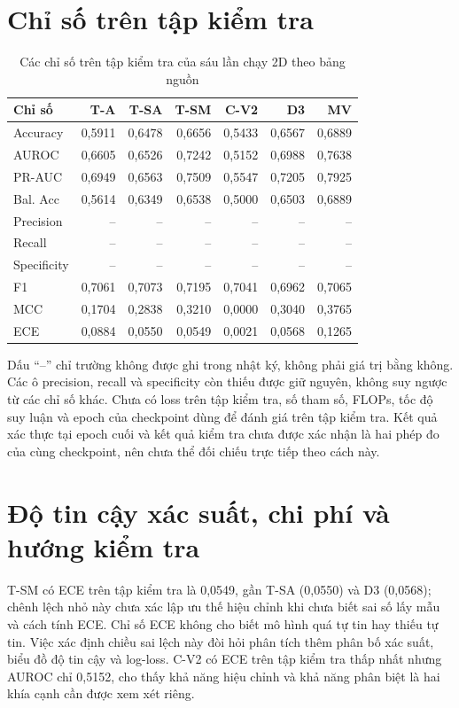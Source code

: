 \documentclass[14pt,a4paper,oneside]{extreport}
\begin{document}
\section{Chỉ số trên tập kiểm tra}
\begin{table}[htbp]
  \centering
  \caption{Các chỉ số trên tập kiểm tra của sáu lần chạy 2D theo bảng nguồn}
  \label{tab:sweep-2d-test}
  \setlength{\tabcolsep}{6pt}
  \begin{tabular}{@{}lrrrrrr@{}}
    \toprule
    Chỉ số & T-A & T-SA & T-SM & C-V2 & D3 & MV\\
    \midrule
    Accuracy & 0,5911 & 0,6478 & 0,6656 & 0,5433 & 0,6567 & 0,6889\\
    AUROC & 0,6605 & 0,6526 & 0,7242 & 0,5152 & 0,6988 & 0,7638\\
    PR-AUC & 0,6949 & 0,6563 & 0,7509 & 0,5547 & 0,7205 & 0,7925\\
    Bal. Acc & 0,5614 & 0,6349 & 0,6538 & 0,5000 & 0,6503 & 0,6889\\
    Precision & -- & -- & -- & -- & -- & --\\
    Recall & -- & -- & -- & -- & -- & --\\
    Specificity & -- & -- & -- & -- & -- & --\\
    F1 & 0,7061 & 0,7073 & 0,7195 & 0,7041 & 0,6962 & 0,7065\\
    MCC & 0,1704 & 0,2838 & 0,3210 & 0,0000 & 0,3040 & 0,3765\\
    ECE & 0,0884 & 0,0550 & 0,0549 & 0,0021 & 0,0568 & 0,1265\\
    \bottomrule
  \end{tabular}
\end{table}
Dấu ``--'' chỉ trường không được ghi trong nhật ký, không phải giá trị bằng không.
Các ô precision, recall và specificity còn thiếu được giữ nguyên, không suy ngược
từ các chỉ số khác. Chưa có loss trên tập kiểm tra, số tham số, FLOPs,
tốc độ suy luận và epoch của checkpoint dùng để đánh giá trên tập kiểm tra.
Kết quả xác thực tại epoch cuối và kết quả kiểm tra chưa được xác nhận là
hai phép đo của cùng checkpoint, nên chưa thể đối chiếu trực tiếp theo cách này.
\FloatBarrier

\section{Độ tin cậy xác suất, chi phí và hướng kiểm tra}
T-SM có ECE trên tập kiểm tra là 0,0549, gần T-SA (0,0550) và D3 (0,0568);
chênh lệch nhỏ này chưa xác lập ưu thế hiệu chỉnh khi chưa biết sai số
lấy mẫu và cách tính ECE. Chỉ số ECE không cho biết mô hình quá tự tin
hay thiếu tự tin. Việc xác định chiều sai lệch này đòi hỏi phân tích
thêm phân bố xác suất, biểu đồ độ tin cậy và log-loss. C-V2 có ECE trên tập kiểm tra thấp nhất
nhưng AUROC chỉ 0,5152, cho thấy khả năng hiệu chỉnh và khả năng phân biệt
là hai khía cạnh cần được xem xét riêng.
\end{document}
